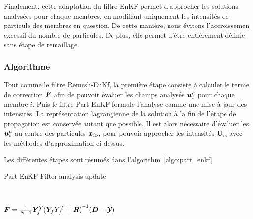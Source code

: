 \begin{itemize}
Finalement, cette adaptation du filtre EnKF permet d'approcher les solutions analysées pour chaque membres, en modifiant uniquement les intensités de particule des membres en question. De cette manière, nous évitons l'accroissemen excessif du nombre de particules. De plus, elle permet d'être entièrement définie sans étape de remaillage.

\subsubsection{Algorithme}

Tout comme le filtre Remesh-EnKf, la première étape consiste à calculer le terme de correction $\bm{F}$ afin de pouvoir évaluer les champs analysés $\bm{u}_i^a$ pour chaque membre $i$. Puis le filtre Part-EnKF formule l'analyse comme une mise à jour des intensités. La représentation lagrangienne de la solution à la fin de l'étape de propagation est conservée autant que possible. Il est alors nécessaire d'évaluer les $\bm{u}_i^a$ au centre des particules $\bm{x}_{ip}$, pour pouvoir approcher les intensités $\bm U_{ip}$ avec les méthodes d'approximation ci-dessus.

Les différentes étapes sont résumés dans l'algorithm~\ref{algo:part_enkf}
\begin{algorithm}
    \caption{Part-EnKF Filter analysis update}~\label{algo:part_enkf}

    $ \bm{F} = \frac{1}{N-1}\bm Y_f^T {(\bm Y_f \bm Y_f^T + \bm R)}^{-1}(\bm{D} - \mathcal{Y})$ 
\end{algorithm}


\end{itemize}
